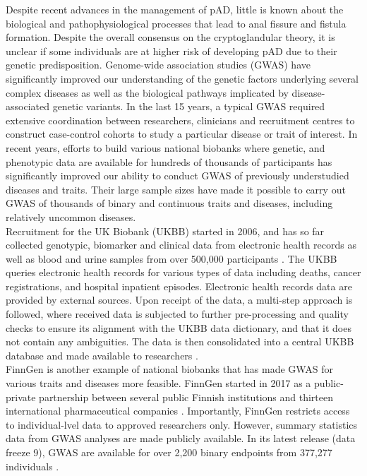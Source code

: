 Despite recent advances in the management of pAD, little is known about the biological and pathophysiological processes that lead to anal fissure and fistula formation. Despite the overall consensus on the cryptoglandular theory, it is unclear if some individuals are at higher risk of developing pAD due to their genetic predisposition. Genome-wide association studies (GWAS) have significantly improved our understanding of the genetic factors underlying several complex diseases as well as the biological pathways implicated by disease-associated genetic variants. In the last 15 years, a typical GWAS required extensive coordination between researchers, clinicians and recruitment centres to construct case-control cohorts to study a particular disease or trait of interest. In recent years, efforts to build various national biobanks where genetic, and phenotypic data are available for hundreds of thousands of participants has significantly improved our ability to conduct GWAS of previously understudied diseases and traits. Their large sample sizes have made it possible to carry out GWAS of thousands of binary and continuous traits and diseases, including relatively uncommon diseases. \\

Recruitment for the UK Biobank (UKBB) started in 2006, and has so far collected genotypic, biomarker and clinical data from electronic health records as well as blood and urine samples from over 500,000 participants \cite{ukbb_showcase}. The UKBB queries electronic health records for various types of data including deaths, cancer registrations, and hospital inpatient episodes. Electronic health records data are provided by external sources. Upon receipt of the data, a multi-step approach is followed, where received data is subjected to further pre-processing and quality checks to ensure its alignment with the UKBB data dictionary, and that it does not contain any ambiguities. The data is then consolidated into a central UKBB database and made available to researchers \cite{ukbb_ehr}.\\

FinnGen is another example of national biobanks that has made GWAS for various traits and diseases more feasible. FinnGen started in 2017 as a public-private partnership between several public Finnish institutions and thirteen international pharmaceutical companies \cite{finngen_forresearchers}. Importantly, FinnGen restricts access to individual-lvel data to approved researchers only. However, summary statistics data from GWAS analyses are made publicly available. In its latest release (data freeze 9), GWAS are available for over 2,200 binary endpoints from 377,277 individuals \cite{finngen_aboutdf9}. \\

